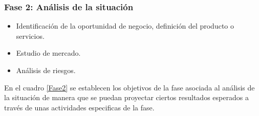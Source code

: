 \subsubsection{Fase 2: Análisis de la situación}
\begin{itemize}
    \item Identificación de la oportunidad de negocio, definición del producto o servicios.
    \item Estudio de mercado.
    \item Análisis de riesgos.
\end{itemize}

En el cuadro \ref{Fase2} se establecen los objetivos de la fase asociada al análisis de la situación de manera que se puedan proyectar ciertos resultados esperados a través de unas actividades especificas de la fase.

